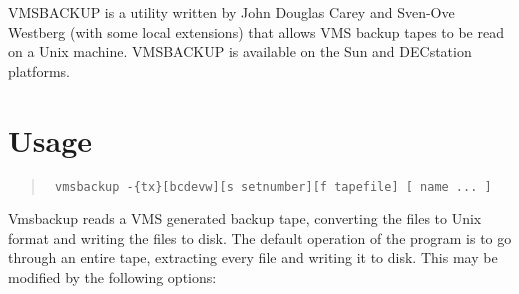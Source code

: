 VMSBACKUP is a utility written by John Douglas Carey and Sven-Ove  Westberg
(with some local extensions) that allows VMS backup tapes to be read on a Unix
machine. VMSBACKUP is available on the Sun and DECstation platforms.

\section{Usage}

\begin{quote}
{\tt
     vmsbackup -\{tx\}[bcdevw][s setnumber][f tapefile] [ name ... ]
}
\end{quote}

Vmsbackup reads a VMS generated backup tape, converting  the files  to  Unix
format  and writing the files to disk.  The default operation of the program is
to go through an  entire tape,  extracting  every  file and writing it to disk.
This may be modified by the following options:

